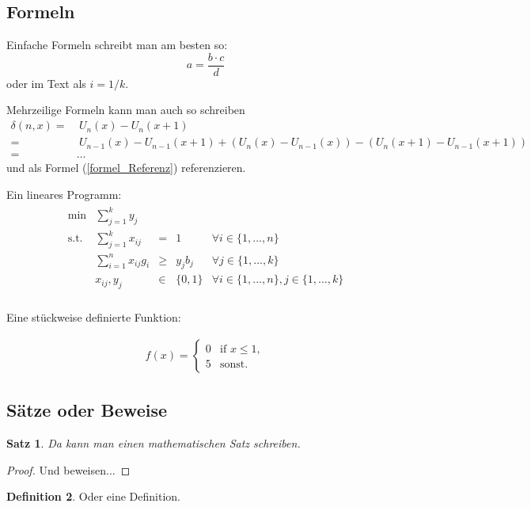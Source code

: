 \documentclass[12pt,a4paper,twoside]{article}
\newtheorem{satz}{Satz}
\theoremstyle{definition}
\newtheorem{definition}[satz]{Definition}
\numberwithin{equation}{section}
\begin{document}
\subsection{Formeln}
Einfache Formeln schreibt man am besten so:
$$
a=\frac{b \cdot c}{d}
$$ 
oder im Text als $i=1/k$.
\vspace{\baselineskip}

Mehrzeilige Formeln kann man auch so schreiben
\begin{align} \label{formel_Referenz}
\delta(n,x) = &\ U_n(x) - U_n(x+1) \\
= &\ U_{n-1}(x) - U_{n-1}(x+1) + \left(U_n(x) - U_{n-1}(x)\right) - \left(U_n(x+1)-U_{n-1}(x+1)\right) \nonumber \\
= & \dots \nonumber
\end{align}
und als Formel (\ref{formel_Referenz}) referenzieren. 
\vspace{\baselineskip}

Ein lineares Programm:
\begin{align}
\begin{array}{llcll}
\text{min}  & \sum \limits_{j=1}^{k} y_{j}        &      &             & \\
\text{s.t.} & \sum \limits_{j=1}^{k} x_{ij}       & =    & 1           & \forall i \in \{1,...,n\} \\
            & \sum \limits_{i=1}^{n} x_{ij} g_{i} & \geq & y_{j} b_{j} & \forall j \in \{1,...,k\} \\
            & x_{ij}, y_{j}                       & \in  & \{0,1\}     & \forall i \in \{1,...,n\}, j \in \{1,...,k\} \\
\end{array}
\tag{LP}
\label{lin_Programm}
\end{align}

Eine stückweise definierte Funktion:

\begin{align}\label{formel2}
f(x) = \begin{cases}
0 & \text{if $x \leq 1$},\\
5 & \text{sonst}.
\end{cases}
\end{align}

\subsection{Sätze oder Beweise}
\begin{satz}
\label{satz_Referenz} 
Da kann man einen mathematischen Satz schreiben.
\end{satz}
\begin{proof}
Und beweisen...
\end{proof}
\begin{definition}
Oder eine Definition.
\end{definition}
\end{document}
